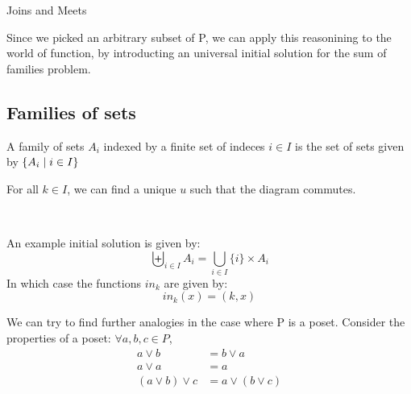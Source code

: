 \begin{section}{Joins and Meets}
\begin{center}
\end{center}

Since we picked an arbitrary subset of P, we can apply this reasonining to
the world of function, by introducting an universal initial solution for 
the sum of families problem.

\subsection{Families of sets}
\begin{definition} A family of sets $A_i$ indexed by a finite set of indeces $i \in I$ is the set of sets given by $\{ A_i \mid i \in I \}$
\end{definition}
For all $k \in I$, we can find a unique $u$ such that the diagram commutes.
\begin{center}
     \\[3mm]
\end{center}

An example initial solution is given by:
\[ \biguplus_{i \in I} A_i = \bigcup_{i \in I} \{i\} \times A_i \]
In which case the functions $in_k$ are given by:
\[ in_k(x) = (k, x)\]

We can try to find further analogies in the case where P is a poset. Consider
the properties of a poset: $\forall a, b, c \in P$,
\begin{align*}
    a \vee b &= b \vee a \\
    a \vee a &= a \\
    (a \vee b) \vee c &= a \vee (b \vee c) \\
\end{align*}


\end{section}
